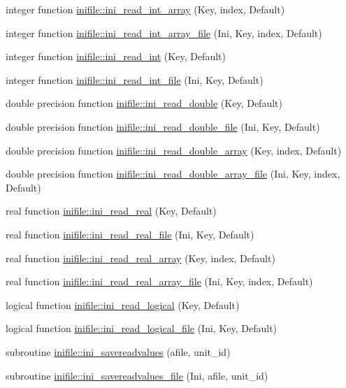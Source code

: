 \begin{DoxyCompactItemize}
\item 
integer function \mbox{\hyperlink{namespaceinifile_adc8c25cb1df4d91c2d6a7c06dbd55f25}{inifile\+::ini\+\_\+read\+\_\+int\+\_\+array}} (Key, index, Default)
\item 
integer function \mbox{\hyperlink{namespaceinifile_a327aeaeeb0b796b9b97cdae69147b0d6}{inifile\+::ini\+\_\+read\+\_\+int\+\_\+array\+\_\+file}} (Ini, Key, index, Default)
\item 
integer function \mbox{\hyperlink{namespaceinifile_a9e879031e39e829173144313b77f5ca7}{inifile\+::ini\+\_\+read\+\_\+int}} (Key, Default)
\item 
integer function \mbox{\hyperlink{namespaceinifile_a86f5e6c25d72652fcacf21732f33ea27}{inifile\+::ini\+\_\+read\+\_\+int\+\_\+file}} (Ini, Key, Default)
\item 
double precision function \mbox{\hyperlink{namespaceinifile_a208e4c210b698f22b9087879ca1ed83e}{inifile\+::ini\+\_\+read\+\_\+double}} (Key, Default)
\item 
double precision function \mbox{\hyperlink{namespaceinifile_aa190adb34f30ac9ceb261db1bff4e736}{inifile\+::ini\+\_\+read\+\_\+double\+\_\+file}} (Ini, Key, Default)
\item 
double precision function \mbox{\hyperlink{namespaceinifile_a0144764d1230507cd08723c17424daea}{inifile\+::ini\+\_\+read\+\_\+double\+\_\+array}} (Key, index, Default)
\item 
double precision function \mbox{\hyperlink{namespaceinifile_a0b015fcd4b5106643a5da8209d5d03d2}{inifile\+::ini\+\_\+read\+\_\+double\+\_\+array\+\_\+file}} (Ini, Key, index, Default)
\item 
real function \mbox{\hyperlink{namespaceinifile_aa8c7c6b2bd003b849faacce75951fd64}{inifile\+::ini\+\_\+read\+\_\+real}} (Key, Default)
\item 
real function \mbox{\hyperlink{namespaceinifile_a307d88edca7f1673a935f6c87c304019}{inifile\+::ini\+\_\+read\+\_\+real\+\_\+file}} (Ini, Key, Default)
\item 
real function \mbox{\hyperlink{namespaceinifile_a9cc4d7fee9f1ff784999850b4d6f0b87}{inifile\+::ini\+\_\+read\+\_\+real\+\_\+array}} (Key, index, Default)
\item 
real function \mbox{\hyperlink{namespaceinifile_aec5d85c08e9381bc15b4dd5f9250a228}{inifile\+::ini\+\_\+read\+\_\+real\+\_\+array\+\_\+file}} (Ini, Key, index, Default)
\item 
logical function \mbox{\hyperlink{namespaceinifile_aaca241da4d51d99116aa6986a2fa9a49}{inifile\+::ini\+\_\+read\+\_\+logical}} (Key, Default)
\item 
logical function \mbox{\hyperlink{namespaceinifile_aa28324391b14e57e0c2a11866bda19f6}{inifile\+::ini\+\_\+read\+\_\+logical\+\_\+file}} (Ini, Key, Default)
\item 
subroutine \mbox{\hyperlink{namespaceinifile_a49bf986c5eea73c39bf9c4168143e81b}{inifile\+::ini\+\_\+savereadvalues}} (afile, unit\+\_\+id)
\item 
subroutine \mbox{\hyperlink{namespaceinifile_a2e53433c13f03131abc980a06455e53b}{inifile\+::ini\+\_\+savereadvalues\+\_\+file}} (Ini, afile, unit\+\_\+id)
\end{DoxyCompactItemize}
